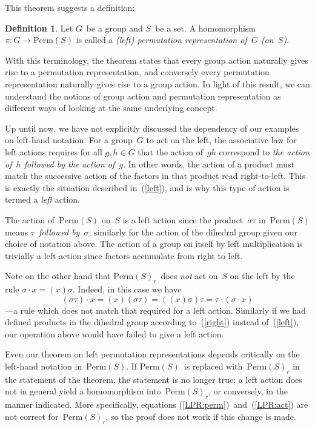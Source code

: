 \documentclass[letterpaper]{article}
\theoremstyle{definition}
\newtheorem*{defn}{Definition}
\theoremstyle{plain}
\newcommand{\perm}[1]{\mathrm{Perm}({#1})}
\begin{document}
\noindent This theorem suggests a definition:
\begin{defn}
Let $G$~be a group and $S$~be a set. A homomorphism $\pi:G\to\perm{S}$ is called a \emph{(left) permutation representation of~$G$ (on~$S$)}.
\end{defn}
\noindent With this terminology, the theorem states that every group action naturally gives rise to a permutation representation, and conversely every permutation representation naturally gives rise to a group action. In light of this result, we can understand the notions of group action and permutation representation as different ways of looking at the same underlying concept.%

Up until now, we have not explicitly discussed the dependency of our examples on left-hand notation. For a group~$G$ to act on the left, the associative law for left actions requires for all $g,h\in G$ that the action of~$gh$ correspond to \emph{the action of~$h$ followed by the action of~$g$}. In other words, the action of a product must match the successive action of the factors in that product read right-to-left. This is exactly the situation described in~(\ref{left}), and is why this type of action is termed a \emph{left} action.

The action of~$\perm{S}$ on~$S$ is a left action since the product~$\sigma\tau$ in~$\perm{S}$ means \emph{$\tau$~followed by~$\sigma$}; similarly for the action of the dihedral group given our choice of notation above. The action of a group on itself by left multiplication is trivially a left action since factors accumulate from right to left.

Note on the other hand that $\perm{S}_r$~does \emph{not} act on~$S$ on the left by the rule $\sigma\cdot x=(x)\sigma$. Indeed, in this case we have
$$(\sigma\tau)\cdot x=(x)(\sigma\tau)=((x)\sigma)\tau=\tau\cdot(\sigma\cdot x)$$
---a rule which does not match that required for a left action. Similarly if we had defined products in the dihedral group according to~(\ref{right}) instead of~(\ref{left}), our operation above would have failed to give a left action.

Even our theorem on left permutation representations depends critically on the left-hand notation in~$\perm{S}$. If $\perm{S}$~is replaced with~$\perm{S}_r$ in the statement of the theorem, the statement is no longer true; a left action does not in general yield a homomorphism into~$\perm{S}_r$, or conversely, in the manner indicated. More specifically, equations (\ref{LPR:perm})~and~(\ref{LPR:act}) are not correct for~$\perm{S}_r$, so the proof does not work if this change is made.
\end{document}
